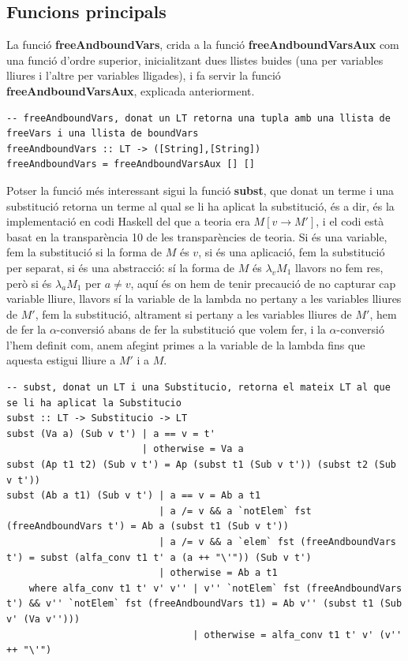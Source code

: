 \documentclass[10pt,a4paper]{article}
\begin{document}
\clearpage

\subsection{Funcions principals}

La funció \textbf{freeAndboundVars}, crida a la funció \textbf{freeAndboundVarsAux} com una funció d'ordre superior, inicialitzant dues llistes buides (una per variables lliures i l'altre per variables lligades), i fa servir la funció \textbf{freeAndboundVarsAux}, explicada anteriorment.

\lstset{language=Haskell, breaklines=true, basicstyle=\footnotesize}
\begin{lstlisting}[frame=mystyle]
-- freeAndboundVars, donat un LT retorna una tupla amb una llista de freeVars i una llista de boundVars
freeAndboundVars :: LT -> ([String],[String])
freeAndboundVars = freeAndboundVarsAux [] []
\end{lstlisting}

Potser la funció més interessant sigui la funció \textbf{subst}, que donat un terme i una substitució retorna un terme al qual se li ha aplicat la substitució, és a dir, és la implementació en codi Haskell del que a teoria era $M [v \rightarrow M']$, i el codi està basat en la transparència 10 de les transparències de teoria. Si és una variable, fem la substitució si la forma de $M$ és $v$, si és una aplicació, fem la substitució per separat, si és una abstracció: sí la forma de $M$ és $\lambda_v M_1$ llavors no fem res, però si és $\lambda_a M_1$ per $a \neq v$, aquí és on hem de tenir precaució de no capturar cap variable lliure, llavors sí la variable de la lambda no pertany a les variables lliures de $M'$, fem la substitució, altrament si pertany a les variables lliures de $M'$, hem de fer la $\alpha$-conversió abans de fer la substitució que volem fer, i la $\alpha$-conversió l'hem definit com, anem afegint primes a la variable de la lambda fins que aquesta estigui lliure a $M'$ i a $M$.

\lstset{language=Haskell, breaklines=true, basicstyle=\footnotesize}
\begin{lstlisting}[frame=mystyle]
-- subst, donat un LT i una Substitucio, retorna el mateix LT al que se li ha aplicat la Substitucio
subst :: LT -> Substitucio -> LT
subst (Va a) (Sub v t') | a == v = t'
                        | otherwise = Va a
subst (Ap t1 t2) (Sub v t') = Ap (subst t1 (Sub v t')) (subst t2 (Sub v t'))
subst (Ab a t1) (Sub v t') | a == v = Ab a t1
                           | a /= v && a `notElem` fst (freeAndboundVars t') = Ab a (subst t1 (Sub v t'))
                           | a /= v && a `elem` fst (freeAndboundVars t') = subst (alfa_conv t1 t' a (a ++ "\'")) (Sub v t')
                           | otherwise = Ab a t1
    where alfa_conv t1 t' v' v'' | v'' `notElem` fst (freeAndboundVars t') && v'' `notElem` fst (freeAndboundVars t1) = Ab v'' (subst t1 (Sub v' (Va v'')))
                                 | otherwise = alfa_conv t1 t' v' (v'' ++ "\'")
\end{lstlisting}
\end{document}

